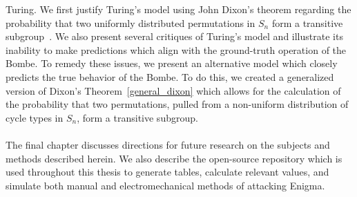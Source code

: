 \documentclass{dcthesis}
\theoremstyle{definition}
\theoremstyle{remark}
\begin{document}
Turing. We first justify Turing's model using John Dixon's theorem regarding the probability that two uniformly distributed permutations in $S_n$ form a transitive subgroup~\cite{Dixon1969}. We also present several critiques of Turing's model and illustrate its inability to make predictions which align with the ground-truth operation of the Bombe. To remedy these issues, we present an alternative model which closely predicts the true behavior of the Bombe. To do this, we created a generalized version of Dixon's Theorem~\ref{general_dixon} which allows for the calculation of the probability that two permutations, pulled from a non-uniform distribution of cycle types in $S_n$, form a transitive subgroup. 
\\\\The final chapter discusses directions for future research on the subjects and methods described herein. We also describe the open-source repository which is used throughout this thesis to generate tables, calculate relevant values, and simulate both manual and electromechanical methods of attacking Enigma.
\end{document}
